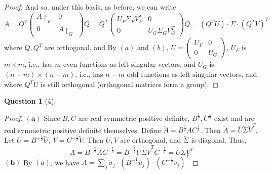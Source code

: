 \documentclass[11pt]{article}
\theoremstyle{quest}
\newtheorem*{question}{Question}
\begin{document}
\begin{proof}
And so, under this basis, as before, we can write
$$A = Q^T \begin{pmatrix}
A \restriction_F & 0 \\
0 & A \restriction_G
\end{pmatrix} Q = Q^T \begin{pmatrix}
U_F \Sigma_F V_F^T & 0 \\
0 & U_G \Sigma_G V_G^T
\end{pmatrix} Q = (Q^TU) \cdot \Sigma \cdot (Q^TV)^T$$
where $Q, Q^T$ are orthogonal, and
By $(a)$ and $(b)$, $U = \begin{pmatrix}
U_F & 0 \\
0 & U_G
\end{pmatrix}$, $U_F$ is $m \times m$, i.e., has $m$ even functions as left singular vectors, and $U_G$ is $(n-m) \times (n-m)$, i.e., has $n-m$ odd functions as left singular vectors, and where
$Q^TU$ is still orthogonal (orthogonal matrices form a group).
\end{proof}

\begin{question}[4]
\end{question}
\begin{proof}
$\mathbf{(a)}$ Since $B, C$ are real symmetric positive definite, $B^{\frac{1}{2}}, C^{\frac{1}{2}}$ exist and are real symmetric positive definite themselves. Define $\tilde{A} = B^{\frac{1}{2}} A C^{\frac{1}{2}}$. Then $\tilde{A} = \tilde{U}  \tilde{\Sigma} \tilde{V}^T$. Let $U = B^{-\frac{1}{2}} \tilde{U},\ V = C^{-\frac{1}{2}} \tilde{V}$. Then $U, V$ are orthogonal, and $\tilde{\Sigma}$ is diagonal. Thus,
$$A = B^{-\frac{1}{2}} \tilde{A} C^{-\frac{1}{2}} = B^{-\frac{1}{2}} \tilde{U}  \tilde{\Sigma} \tilde{V}^T C^{-\frac{1}{2}} = U \tilde{\Sigma} V^T$$
$\mathbf{(b)}$ By $(a)$, we have $A = \sum_j \tilde{\sigma}_j \cdot (B^{-\frac{1}{2}} \tilde{u_j}) \cdot (C^{-\frac{1}{2}} \tilde{v_j})^T$
\end{proof}
\end{document}
